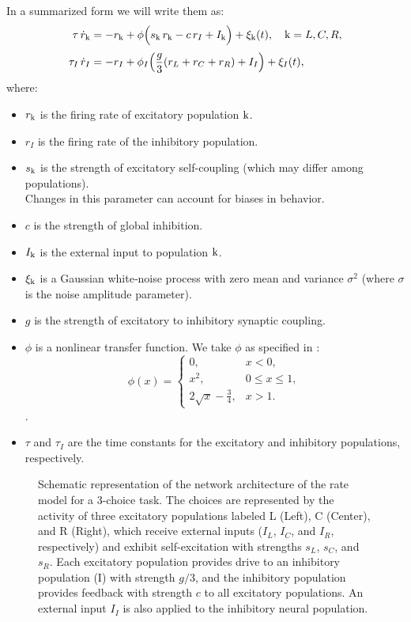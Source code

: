 \documentclass[../main.tex]{subfiles}
\begin{document}
In a summarized form we will write them as:
\begin{subequations}
\label{eq:rates-summarized}
\begin{align}
  \tau\,\dot{r}_{\mathrm{k}} &= -r_{\mathrm{k}} + \phi\Bigl(s_{\mathrm{k}}\,r_{\mathrm{k}} - c\,r_I + I_{\mathrm{k}} \Bigr)+\xi_{\mathrm{k}}(t), \quad \mathrm{k}=L,C,R, \label{eq:exc}\\[1mm]
  \tau_I\,\dot{r}_I &= -r_I + \phi_I\Bigl(\frac{g}{3}(r_L+r_C+r_R)+I_I\Bigr)+\xi_I(t), \label{eq:inh}
\end{align}
\end{subequations}
where:
\begin{itemize}
  \item \(r_{\mathrm{k}}\) is the firing rate of excitatory population $\mathrm{k}$.
  \item $r_I$ is the firing rate of the inhibitory population.
  \item $s_{\mathrm{k}}$ is the strength of excitatory self-coupling (which may differ among populations).\\ Changes in this parameter can  account for biases in behavior.
  \item $c$ is the strength of global inhibition.
  \item $I_{\mathrm{k}}$ is the external input to population $\mathrm{k}$.
  \item $\xi_{\mathrm{k}}$ is a Gaussian white‐noise process with zero mean and variance $\sigma^{2}$ (where $\sigma$ is the noise amplitude parameter).
  \item $g$ is the strength of excitatory to inhibitory synaptic coupling.
  \item $\phi$ is a nonlinear transfer function. We take $\phi$ as specified in \cite{roxin2019}: 
  \[\displaystyle \phi(x)=\begin{cases}0,&x<0,\\x^2,&0\le x\le1,\\2\sqrt{x}-\tfrac34,&x>1.\end{cases}\].
  \item $\tau$ and $\tau_I$ are the time constants for the excitatory and inhibitory populations, respectively.
\end{itemize}



\begin{figure}[H]
\centering

\caption{Schematic representation of the network architecture of the rate model for a 3-choice task. The choices are represented by the activity of three excitatory populations labeled L (Left), C (Center), and R (Right), which receive external inputs ($I_L$, $I_C$, and $I_R$, respectively) and exhibit self-excitation with strengths $s_L$, $s_C$, and $s_R$. Each excitatory population provides drive to an inhibitory population (I) with strength $g/3$, and the inhibitory population provides feedback with strength $c$ to all excitatory populations. An external input $I_I$ is also applied to the inhibitory neural population.}
\label{fig:model-rates}
\end{figure}
\end{document}

